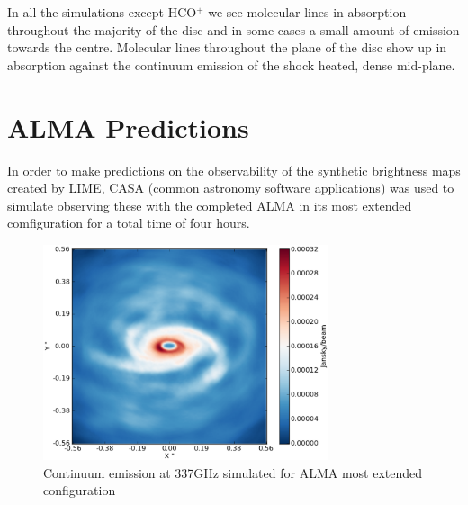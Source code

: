 \documentclass[useAMS,usenatbib]{mn2e}
\begin{document}
In all the simulations except HCO$^+$ we see molecular lines in absorption throughout the majority of the disc and in some cases a small amount of emission towards the centre. Molecular lines throughout the plane of the disc show up in absorption against the continuum emission of the shock heated, dense mid-plane. 





\section{ALMA Predictions} \label{sec:alma_predictions}

In order to make predictions on the observability of the synthetic brightness maps created by LIME, CASA (common astronomy software applications) was used to simulate observing these with the completed ALMA in its most extended comfiguration for a total time of four hours.

\begin{figure}
 \includegraphics[width=84mm]{Figures/sim/casa_cont_337GHz.eps}

 \caption{Continuum emission at 337GHz simulated for ALMA most extended configuration}
\end{figure}



%
%
%
%
%
\end{document}

